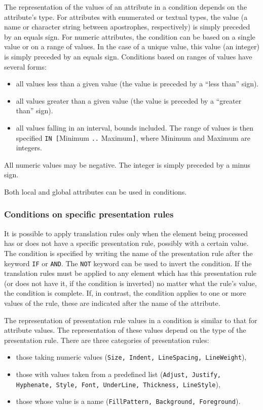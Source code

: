 \label{relattr}
The representation of the values of an attribute in a condition depends
on the attribute's type.  For attributes with enumerated or textual
types, the value (a name or character string between apostrophes,
respectively) is simply preceded by an equals sign.  For numeric
attributes, the condition can be based on a single value or on a range
of values.  In the case of a unique value, this value (an integer) is
simply preceded by an equals sign.  Conditions based on ranges of
values have several forms:
\begin{itemize}
\item all values less than a given value (the value is preceded by a
``less than'' sign).

\item all values greater than a given value (the value is preceded by a
``greater than'' sign).

\item all values falling in an interval, bounds included.  The range
of values is then specified {\tt IN [}Minimum {\tt ..} Maximum{\tt]},
where Minimum and Maximum are integers.

\end{itemize}
All numeric values may be negative.  The integer is simply preceded by
a minus sign.

Both local and global attributes can be used in conditions.

\subsubsection{Conditions on specific presentation rules}

It is possible to apply translation rules only when the element being
processed has or does not have a specific presentation rule, possibly
with a certain value.  The condition is specified by writing the name
of the presentation rule after the keyword {\tt IF} or {\tt AND}.  The
{\tt NOT} keyword can be used to invert the condition.  If the
translation rules must be applied to any element which has this
presentation rule (or does not have it, if the condition is inverted) no
matter what the rule's value, the condition is complete.  If, in
contrast, the condition applies to one or more values of the
rule, these are indicated after the name of the attribute.

The representation of presentation rule values in a condition is
similar to that for attribute values.  The representation of these
values depend on the type of the presentation rule. There are three
categories of presentation rules:
\begin{itemize}
\item those taking numeric values ({\tt Size, Indent, LineSpacing,
LineWeight}),

\item those with values taken from a predefined list ({\tt Adjust,
Justify, Hyphenate, Style, Font, UnderLine, Thickness, LineStyle}),

\item those whose value is a name ({\tt FillPattern, Background,
Foreground}).

\end{itemize}

